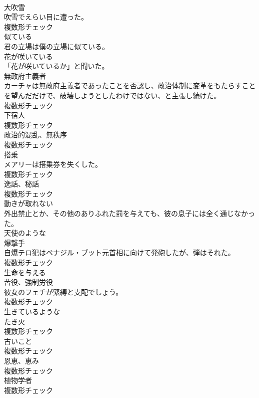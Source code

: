 \documentclass[8pt]{extreport}
\begin{document}
\begin{CJK}{UTF8}{min}
\\	[名詞]	大吹雪	
\\	吹雪でえらい目に遭った。	
\\	複数形チェック
\\	[形容詞]	似ている	
\\	君の立場は僕の立場に似ている。	
\\	[形容詞]	花が咲いている	
\\	「花が咲いているか」と聞いた。	
\\	[名詞]	無政府主義者	
\\	カーチャは無政府主義者であったことを否認し、政治体制に変革をもたらすことを望んだだけで、破壊しようとしたわけではない、と主張し続けた。	
\\	複数形チェック
\\	[名詞]	下宿人	
\\	複数形チェック
\\	[名詞]	政治的混乱、無秩序	
\\	複数形チェック
\\	[名詞]	搭乗	
\\	メアリーは搭乗券を失くした。	
\\	複数形チェック
\\	[名詞]	逸話、秘話	
\\	複数形チェック
\\	[動詞]	動きが取れない	
\\	外出禁止とか、その他のありふれた罰を与えても、彼の息子には全く通じなかった。	
\\	[形容詞]	天使のような	
\\	[名詞]	爆撃手	
\\	自爆テロ犯はベナジル・ブット元首相に向けて発砲したが、弾はそれた。	
\\	複数形チェック
\\	[動詞]	生命を与える	
\\	[名詞]	苦役、強制労役	
\\	彼女のフェチが緊縛と支配でしょう。	
\\	複数形チェック
\\	[形容詞]	生きているような	
\\	[名詞]	たき火	
\\	複数形チェック
\\	[名詞]	古いこと	
\\	複数形チェック
\\	[名詞]	恩恵、恵み	
\\	複数形チェック
\\	[名詞]	植物学者	
\\	複数形チェック

\end{CJK}
\end{document}

